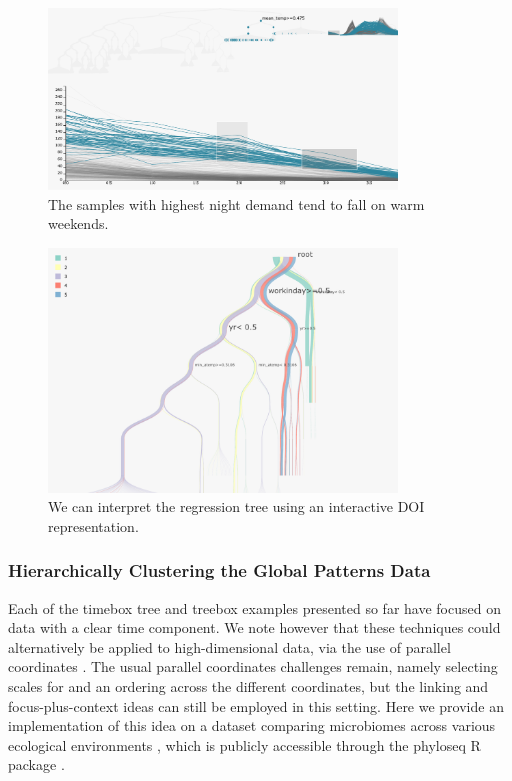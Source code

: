 \documentclass[12pt]{article}
\begin{document}
\begin{figure}

{\centering \includegraphics[width=350px]{figure/warm_weekend} 

}

\caption{The samples with highest night demand tend to fall on warm weekends.}\label{fig:warmweekend}
\end{figure}

\begin{figure}

{\centering \includegraphics[width=350px]{figure/bike_sankey} 

}

\caption{We can interpret the regression tree using an interactive DOI representation.}\label{fig:bikesankey}
\end{figure}

\subsubsection*{Hierarchically Clustering the Global Patterns Data}\label{global_patterns}

Each of the timebox tree and treebox examples presented so far have
focused on data with a clear time component. We note however that these
techniques could alternatively be applied to high-dimensional data, via
the use of parallel coordinates \citep{inselberg1991parallel}. The usual
parallel coordinates challenges remain, namely selecting scales for and an
ordering across the different coordinates, but the linking and
focus-plus-context ideas can still be employed in this setting. Here we
provide an implementation of this idea on a dataset comparing microbiomes across
various ecological environments \citep{caporaso2011global}, which is publicly
accessible through the phyloseq R package \citep{mcmurdie2013phyloseq}.
\end{document}
